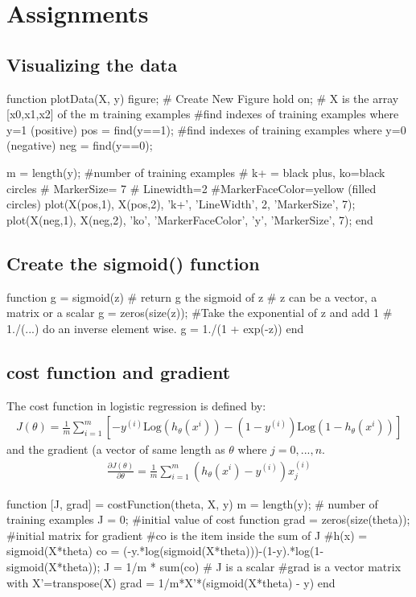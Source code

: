 \documentclass[a4paper,12pt]{report}
\begin{document}
\section{Assignments}
\subsection{Visualizing the data}
\begin{python}
function plotData(X, y)
	figure;  # Create New Figure
	hold on;
	# X is the array [x0,x1,x2] of the m training examples
	#find indexes of training examples where y=1 (positive)
	pos = find(y==1);
	#find indexes of training examples where y=0 (negative)
	neg = find(y==0); 

	m = length(y); #number of training examples
	# k+ = black plus, ko=black circles
	# MarkerSize= 7
	# Linewidth=2
	#MarkerFaceColor=yellow (filled circles)
	plot(X(pos,1), X(pos,2), 'k+', 'LineWidth', 2, 'MarkerSize', 7);
	plot(X(neg,1), X(neg,2), 'ko', 'MarkerFaceColor', 'y', 'MarkerSize', 7);
end
\end{python}
\subsection{Create the sigmoid() function}
\begin{python}
function g = sigmoid(z)
	# return g the sigmoid of z
	# z can be a vector, a matrix or a scalar
	g = zeros(size(z)); 
	#Take the exponential of z and add 1
	# 1./(...) do an inverse element wise.
	g = 1./(1 + exp(-z))
end
\end{python}
\subsection{cost function and gradient}
The cost function in logistic regression is defined by:
\begin{align*}
J(\theta) = \frac{1}{m} \sum_{i=1} ^{m} \left[-y^{(i)} \mathrm{Log}\left(h_{\theta}(x^{i})\right) - (1- y^{(i)}) \mathrm{Log}\left(1-h_{\theta}(x^{i})\right) \right]
\end{align*}
and the gradient (a vector of same length as $\theta$ where $j=0,...,n$.
\begin{align*}
\frac{\partial J(\theta)}{\partial \theta} = \frac{1}{m} \sum_{i=1} ^{m} \left( h_{\theta}(x^{i}) - y^{(i)}\right) x_j ^{(i)}
\end{align*}
\begin{python}
function [J, grad] = costFunction(theta, X, y)
	m = length(y); # number of training examples
	J = 0; #initial value of cost function
	grad = zeros(size(theta)); #initial matrix for gradient
	#co is the item inside the sum of J
	#h(x) = sigmoid(X*theta)
	co = (-y.*log(sigmoid(X*theta)))-(1-y).*log(1-sigmoid(X*theta)); 
	J = 1/m * sum(co) # J is a scalar
	#grad is a vector matrix with X'=transpose(X)
	grad = 1/m*X'*(sigmoid(X*theta) - y) 
end
\end{python}
\end{document}
